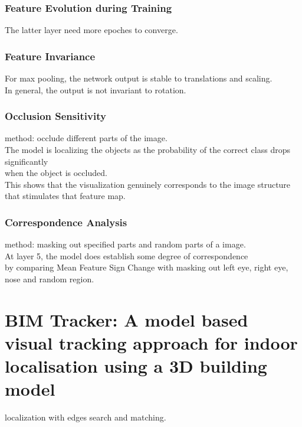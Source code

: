 \documentclass[11pt]{article}
\begin{document}
\subsubsection{Feature Evolution during Training}
\label{sec-3-4-2}
The latter layer need more epoches to converge. \\


\subsubsection{Feature Invariance}
\label{sec-3-4-3}
For max pooling, the network output is stable to translations and scaling. \\
In general, the output is not invariant to rotation. \\



\subsubsection{Occlusion Sensitivity}
\label{sec-3-4-4}
method: occlude different parts of the image. \\

The model is localizing the objects as the probability of the correct class drops significantly \\
when the object is occluded. \\

This shows that the visualization genuinely corresponds to the image structure \\
that stimulates that feature map. \\


\subsubsection{Correspondence Analysis}
\label{sec-3-4-5}
method: masking out specified parts and random parts of a image. \\

At layer 5, the model does establish some degree of correspondence \\
by comparing Mean Feature Sign Change with masking out left eye, right eye, nose and random region. \\


\section{BIM Tracker: A model based visual tracking approach for indoor localisation using a 3D building model}
\label{sec-4}
localization with edges search and matching. \\
\end{document}
